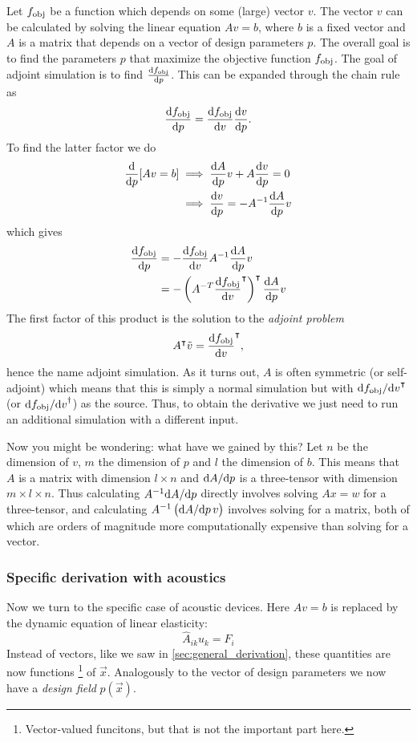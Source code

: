 Let $f_\text{obj}$ be a function which depends on some (large) vector $v$.
The vector $v$ can be calculated by solving the linear equation
$A v = b$, where $b$ is a fixed vector and $A$ is a matrix that depends on a
vector of design parameters $p$.
The overall goal is to find the parameters $p$ that maximize the objective
function $f_\text{obj}$.
The goal of adjoint simulation is to find $\diff{\fobj}{p}$.
This can be expanded through the chain rule as
\[
	\diff{\fobj}{p} = \diff{\fobj}{v} \diff{v}{p}.
\]
To find the latter factor we do
\begin{align*}
	\diff{}{p} [Av = b] &\implies \diff{A}{p} v + A \diff{v}{p} = 0\\
						&\implies \diff{v}{p} = -A^{-1} \diff{A}{p} v
\end{align*}
which gives
\begin{align}
	\diff{\fobj}{p} &= - \diff{\fobj}{v} A^{-1} \diff{A}{p}
	v\label{eq:no_adj_sim}\\
	&= - \left(A^{-T} \diff{\fobj}{v}^\transpose \right)^\transpose \diff{A}{p} v
\end{align}
The first factor of this product is the solution to the \emph{adjoint problem}
\begin{equation}
	A^\transpose \tilde v = \diff{\fobj}{v}^\transpose,
\end{equation}
hence the name adjoint simulation.
As it turns out, $A$ is often symmetric (or self-adjoint) which means that this is simply a normal
simulation but with $\difs{\fobj}{v}^\transpose$ (or $\difs{\fobj}{v}^\dagger$) as the source.
Thus, to obtain the derivative we just need to run an additional
simulation with a different input.

Now you might be wondering: what have we gained by this?
Let $n$ be the dimension of $v$, $m$ the dimension of $p$ and $l$ the dimension
of $b$.
This means that $A$ is a matrix with dimension $l\times n$ and $\difs{A}{p}$ is
a three-tensor with dimension $m\times l\times n$.
Thus calculating $A^{-1} \difs{A}{p}$ directly involves solving $Ax = w$ for a
three-tensor, and calculating $A^{-1} \left(\difs{A}{p}\,v\right)$
involves solving for a matrix, both of which are orders of magnitude more
computationally expensive than solving for a vector.

\subsubsection{Specific derivation with acoustics}\label{sec:spec_der}

Now we turn to the specific case of acoustic devices.
Here $A v = b$ is replaced by the dynamic equation  of linear elasticity:
\begin{equation}\label{eq:sim_eq}
	\hat A_{ik} u_k = F_i
\end{equation}
Instead of vectors, like we saw in \cref{sec:general_derivation}, these quantities are now functions%
\footnote{%
	Vector-valued funcitons, but that is not the important part here.
}
of $\vec x$.
Analogously to the vector of design parameters we now have a \emph{design field}
$p(\vec x)$.

